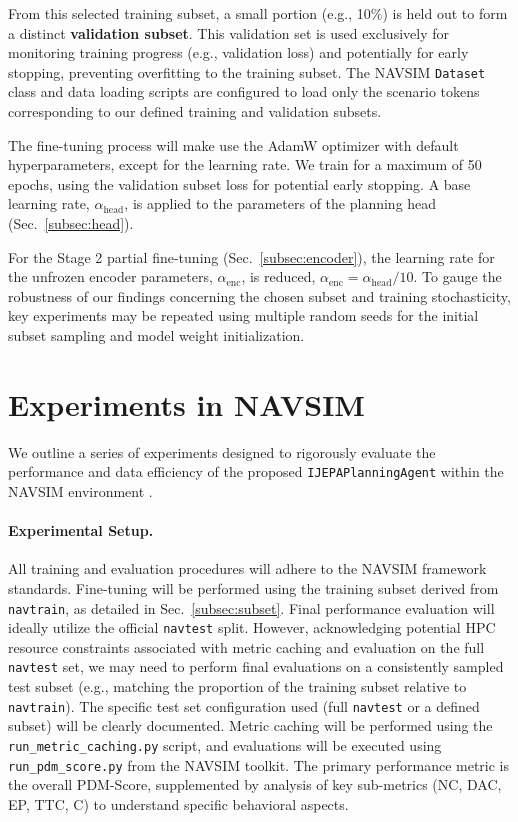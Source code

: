 \documentclass{article}
\begin{document}
From this selected training subset, a small portion (e.g., 10\%) is held out to form a distinct \textbf{validation subset}. This validation set is used exclusively for monitoring training progress (e.g., validation loss) and potentially for early stopping, preventing overfitting to the training subset. The NAVSIM \texttt{Dataset} class and data loading scripts are configured to load only the scenario tokens corresponding to our defined training and validation subsets.

The fine-tuning process will make use the AdamW optimizer \cite{loshchilov2017decoupled} with default hyperparameters, except for the learning rate. We train for a maximum of 50 epochs, using the validation subset loss for potential early stopping. A base learning rate, $\alpha_{\text{head}}$, is applied to the parameters of the planning head (Sec.~\ref{subsec:head}). 

For the Stage 2 partial fine-tuning (Sec.~\ref{subsec:encoder}), the learning rate for the unfrozen encoder parameters, $\alpha_{\text{enc}}$, is reduced, $\alpha_{\text{enc}} = \alpha_{\text{head}} / 10$. To gauge the robustness of our findings concerning the chosen subset and training stochasticity, key experiments may be repeated using multiple random seeds for the initial subset sampling and model weight initialization.

\section{Experiments in NAVSIM}
\label{sec:experiments}
We outline a series of experiments designed to rigorously evaluate the performance and data efficiency of the proposed \texttt{IJEPAPlanningAgent} within the NAVSIM environment \cite{dauner2024navsim}.

\paragraph{Experimental Setup.}
All training and evaluation procedures will adhere to the NAVSIM framework standards. Fine-tuning will be performed using the training subset derived from \texttt{navtrain}, as detailed in Sec.~\ref{subsec:subset}. Final performance evaluation will ideally utilize the official \texttt{navtest} split. However, acknowledging potential HPC resource constraints associated with metric caching and evaluation on the full \texttt{navtest} set, we may need to perform final evaluations on a consistently sampled test subset (e.g., matching the proportion of the training subset relative to \texttt{navtrain}). The specific test set configuration used (full \texttt{navtest} or a defined subset) will be clearly documented. Metric caching will be performed using the \texttt{run\_metric\_caching.py} script, and evaluations will be executed using \texttt{run\_pdm\_score.py} from the NAVSIM toolkit. The primary performance metric is the overall PDM-Score, supplemented by analysis of key sub-metrics (NC, DAC, EP, TTC, C) to understand specific behavioral aspects.
\end{document}
